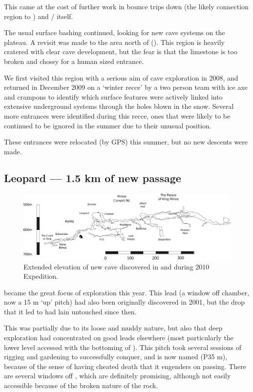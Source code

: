 This came at the cost of further work in bounce trips down  (the likely connection region to ) and  /  itself.

The usual surface bashing continued, looking for new cave systems on the
plateau. A revisit was made to the area north of  (). This region is
heavily cratered with clear cave development, but the fear is that the
limestone is too broken and chossy for a human sized entrance.

We first visited this region with a serious aim of cave exploration in
2008, and returned in December 2009 on a `winter recce' by a two person
team with ice axe and crampons to identify which surface features were
actively linked into extensive underground systems through the holes
blown in the snow. Several more entrances were identified during this
recce, ones that were likely to be continued to be ignored in the summer
due to their unusual position.

These entrances were relocated (by GPS) this summer, but no new descents were made.


\subsection{Leopard --- 1.5 km of new
passage}

\begin{figure}
\centering
\includegraphics[width=0.9\columnwidth]{2010/expo_findings/2010_new_stuff_extended_extraction.pdf}
\caption{Extended elevation of new cave discovered in \protect{} and \protect{} during 2010 Expedition.}
\end{figure}

 became the great focus of exploration this year. This lead (a window off  chamber, now a 15 m `up' pitch) had also been originally discovered in 2001, but the drop that it led to had lain untouched since then.

This was partially due to its loose and muddy nature, but also that deep
exploration had concentrated on good leads elsewhere (most particularly
the lower  level accessed with the bottoming of
). This pitch took several sessions of rigging and
gardening to successfully conquer, and is now named  (P35
m), because of the sense of having cheated death that it engenders on
passing. There are several windows off ,
which are definitely promising,
although not easily accessible because of the broken nature of the rock.

